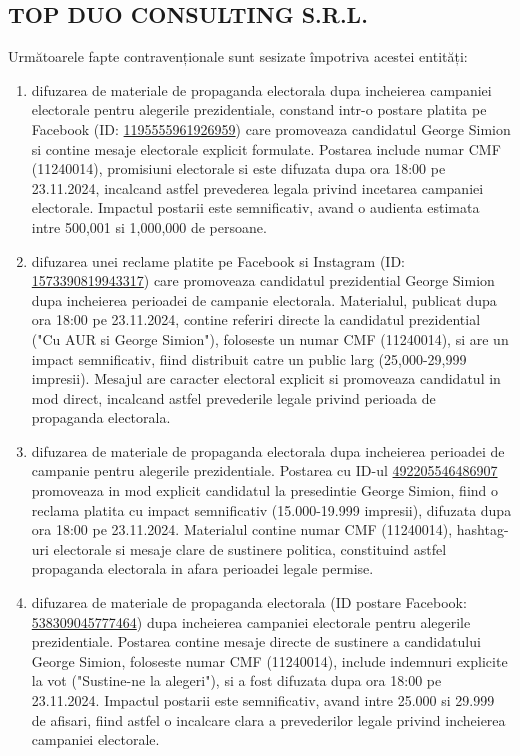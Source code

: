 \documentclass[a4paper,12pt]{article}
\begin{document}
\vspace{0.5cm}

\subsection{TOP DUO CONSULTING S.R.L.}
Următoarele fapte contravenționale sunt sesizate împotriva acestei entități:

\begin{enumerate}[leftmargin=*, label=\arabic*.)]
    \item difuzarea de materiale de propaganda electorala dupa incheierea campaniei electorale pentru alegerile prezidentiale, constand intr-o postare platita pe Facebook (ID: \href{https://www.facebook.com/ads/library/?id=1195555961926959}{1195555961926959}) care promoveaza candidatul George Simion si contine mesaje electorale explicit formulate. Postarea include numar CMF (11240014), promisiuni electorale si este difuzata dupa ora 18:00 pe 23.11.2024, incalcand astfel prevederea legala privind incetarea campaniei electorale. Impactul postarii este semnificativ, avand o audienta estimata intre 500,001 si 1,000,000 de persoane.
    \item difuzarea unei reclame platite pe Facebook si Instagram (ID: \href{https://www.facebook.com/ads/library/?id=1573390819943317}{1573390819943317}) care promoveaza candidatul prezidential George Simion dupa incheierea perioadei de campanie electorala. Materialul, publicat dupa ora 18:00 pe 23.11.2024, contine referiri directe la candidatul prezidential ("Cu AUR si George Simion"), foloseste un numar CMF (11240014), si are un impact semnificativ, fiind distribuit catre un public larg (25,000-29,999 impresii). Mesajul are caracter electoral explicit si promoveaza candidatul in mod direct, incalcand astfel prevederile legale privind perioada de propaganda electorala.
    \item difuzarea de materiale de propaganda electorala dupa incheierea perioadei de campanie pentru alegerile prezidentiale. Postarea cu ID-ul \href{https://www.facebook.com/ads/library/?id=492205546486907}{492205546486907} promoveaza in mod explicit candidatul la presedintie George Simion, fiind o reclama platita cu impact semnificativ (15.000-19.999 impresii), difuzata dupa ora 18:00 pe 23.11.2024. Materialul contine numar CMF (11240014), hashtag-uri electorale si mesaje clare de sustinere politica, constituind astfel propaganda electorala in afara perioadei legale permise.
    \item difuzarea de materiale de propaganda electorala (ID postare Facebook: \href{https://www.facebook.com/ads/library/?id=538309045777464}{538309045777464}) dupa incheierea campaniei electorale pentru alegerile prezidentiale. Postarea contine mesaje directe de sustinere a candidatului George Simion, foloseste numar CMF (11240014), include indemnuri explicite la vot ("Sustine-ne la alegeri"), si a fost difuzata dupa ora 18:00 pe 23.11.2024. Impactul postarii este semnificativ, avand intre 25.000 si 29.999 de afisari, fiind astfel o incalcare clara a prevederilor legale privind incheierea campaniei electorale.

\end{enumerate}
\end{document}
